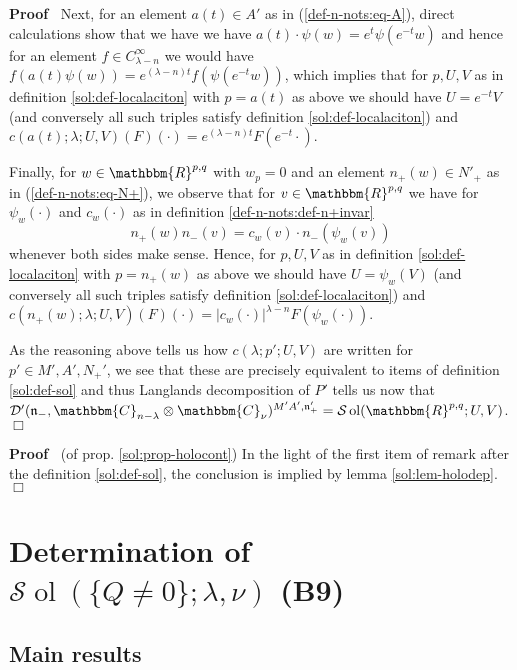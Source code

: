 \documentclass{article}
\newcommand{\tmop}[1]{\ensuremath{\operatorname{#1}}}
\renewenvironment{proof}{\noindent\textbf{Proof\ }}{\hspace*{\fill}$\Box$\medskip}
\theoremstyle{remark}
\begin{document}
\begin{proof}
  Next, for an element $a (t) \in A'$ as in (\ref{def-n-nots:eq-A}), direct
  calculations show that we have we have $a (t) \cdot \psi (w) = e^t \psi
  (e^{- t} w)$ and hence for an element $f \in C^{\infty}_{\lambda - n}$ we
  would have $f (a (t) \psi (w)) = e^{(\lambda - n) t} f (\psi (e^{- t} w))$,
  which implies that for $p, U, V$ as in definition \ref{sol:def-localaciton}
  with $p = a (t)$ as above we should have $U = e^{- t} V$ (and conversely all
  such triples satisfy definition \ref{sol:def-localaciton}) and $c (a (t) ;
  \lambda ; U, V) (F) (\cdot) = e^{(\lambda - n) t} F (e^{- t} \cdot)$.
  
  Finally, for $w \in \mathbbm{R}^{p, q}$ with $w_p = 0$ and an element $n_+
  (w) \in N'_+$ as in (\ref{def-n-nots:eq-N+}), we observe that for $v \in
  \mathbbm{R}^{p, q}$ we have for $\psi_w (\cdot)$ and $c_w (\cdot)$ as in
  definition \ref{def-n-nots:def-n+invar}
  \[ n_+ (w) n_- (v) = c_w (v) \cdot n_- (\psi_w (v)) \]
  whenever both sides make sense. Hence, for $p, U, V$ as in definition
  \ref{sol:def-localaciton} with $p = n_+ (w)$ as above we should have $U =
  \psi_w (V)$ (and conversely all such triples satisfy definition
  \ref{sol:def-localaciton}) and $c (n_+ (w) ; \lambda ; U, V) (F) (\cdot) = |
  c_w (\cdot) |^{\lambda - n} F (\psi_w (\cdot))$.
  
  As the reasoning above tells us how $c (\lambda ; p' ; U, V)$ are written
  for $p' \in M', A', N_+'$, we see that these are precisely equivalent to
  items of definition \ref{sol:def-sol} and thus Langlands decomposition of
  $P'$ tells us now that $\mathcal{D}' (\mathfrak{n}_-, \mathbbm{C}_{n -
  \lambda} \otimes \mathbbm{C}_{\nu})^{M' A', \mathfrak{n}'_+} =\mathcal{S}
  \tmop{ol} (\mathbbm{R}^{p, q} ; U, V)$.
\end{proof}

\begin{proof}
  (of prop. \ref{sol:prop-holocont}) In the light of the first item of remark
  after the definition \ref{sol:def-sol}, the conclusion is implied by lemma
  \ref{sol:lem-holodep}.
\end{proof}

\section{Determination of $\mathcal{S} \tmop{ol} (\{ Q \neq 0 \} ; \lambda,\nu)$ (B9)}\label{sec:lem67}


\subsection{Main results}
\end{document}
